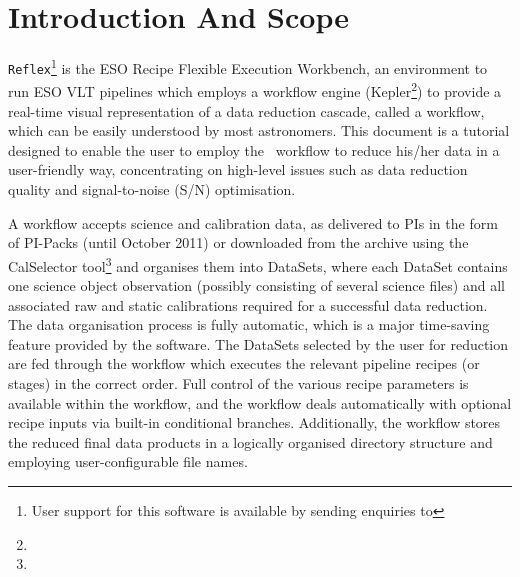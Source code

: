 \section{Introduction And Scope}

{\tt Reflex}\footnote{User support for this software is available by sending 
enquiries to } is the ESO Recipe Flexible Execution 
Workbench, an environment to run ESO VLT pipelines which employs a workflow 
engine (Kepler\footnote{}) to provide a real-time
visual representation of a data reduction cascade, called a workflow,
which can be easily understood by most astronomers.  This document is
a tutorial designed to enable the user to employ the \instname\, workflow to
reduce his/her data in a user-friendly way, concentrating on
high-level issues such as data reduction quality and signal-to-noise 
(S/N) optimisation.

A workflow accepts science and calibration data, as delivered to PIs
in the form of PI-Packs (until October 2011) or downloaded from the
archive using the CalSelector
tool\footnote{} and
organises them into DataSets, where each DataSet contains one
science object observation (possibly consisting of several science
files) and all associated raw and static calibrations required for a
successful data reduction. The data organisation process is fully
automatic, which is a major time-saving feature provided by the
software. The DataSets selected by the user for reduction are fed
through the workflow which executes the relevant pipeline recipes (or
stages) in the correct order.
Full control of the
various recipe parameters is available within the workflow, and the
workflow deals automatically with optional recipe inputs via built-in
conditional branches. Additionally, the workflow stores the reduced
final data products in a logically organised directory structure and
employing user-configurable file names.
